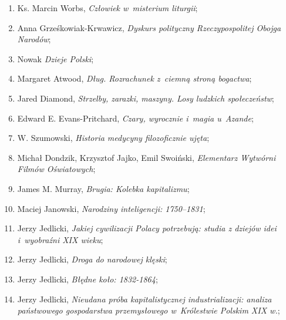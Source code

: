 \documentclass[a4paper,11pt]{article}
\begin{document}
\begin{enumerate}
\item Ks. Marcin Worbs, \textit{Człowiek w~misterium liturgii};



\item Anna Grześkowiak-Krwawicz, \textit{Dyskurs polityczny
    Rzeczypospolitej Obojga Narodów};



\item Nowak \textit{Dzieje Polski};



\item Margaret Atwood, \textit{Dług. Rozrachunek z~ciemną stroną
    bogactwa};



\item Jared Diamond, \textit{Strzelby, zarazki, maszyny. Losy ludzkich
    społeczeństw};



\item Edward E. Evans-Pritchard, \textit{Czary, wyrocznie i~magia
    u~Azande};



\item W. Szumowski, \textit{Historia medycyny filozoficznie ujęta};



\item Michał Dondzik, Krzysztof Jajko, Emil Swoiński, \textit{Elementarz
    Wytwórni Filmów Oświatowych};



\item James M. Murray, \textit{Brugia: Kolebka kapitalizmu};



\item Maciej Janowski, \textit{Narodziny inteligencji: 1750--1831};



\item Jerzy Jedlicki, \textit{Jakiej cywilizacji Polacy potrzebują:
    studia z dziejów idei i~wyobraźni XIX wieku};



\item Jerzy Jedlicki, \textit{Droga do narodowej klęski};



\item Jerzy Jedlicki, \textit{Błędne koło: 1832-1864};



\item Jerzy Jedlicki, \textit{Nieudana próba kapitalistycznej
    industrializacji: analiza państwowego gospodarstwa przemysłowego
    w~Królestwie Polskim XIX w.};




\end{enumerate}
\end{document}
